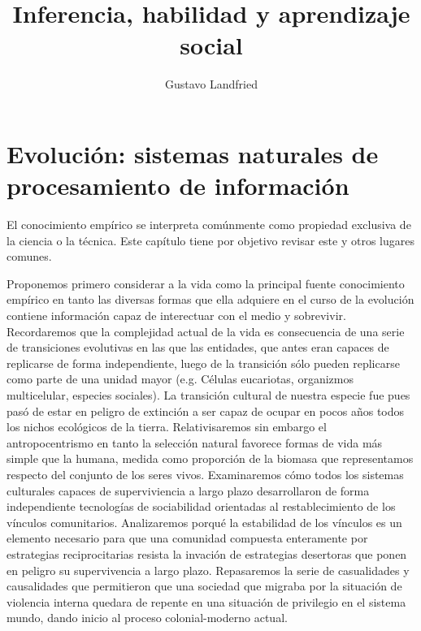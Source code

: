 \documentclass[a4paper,10pt]{book}
\title{\huge Inferencia, habilidad y aprendizaje social}
\author{Gustavo Landfried}
\theoremstyle{definition}
\begin{document}
\maketitle

\tableofcontents


\chapter{Evolución: sistemas naturales de procesamiento de información}




El conocimiento empírico se interpreta comúnmente como propiedad exclusiva de la ciencia o la técnica.
Este capítulo tiene por objetivo revisar este y otros lugares comunes.

Proponemos primero considerar a la vida como la principal fuente conocimiento empírico en tanto las diversas formas que ella adquiere en el curso de la evolución contiene información capaz de interectuar con el medio y sobrevivir.
Recordaremos que la complejidad actual de la vida es consecuencia de una serie de transiciones evolutivas en las que las entidades, que antes eran capaces de replicarse de forma independiente, luego de la transición sólo pueden replicarse como parte de una unidad mayor (e.g. Células eucariotas, organizmos multicelular, especies sociales).
La transición cultural de nuestra especie fue  pues pasó de estar en peligro de extinción a ser capaz de ocupar en pocos años todos los nichos ecológicos de la tierra.
Relativisaremos sin embargo el antropocentrismo en tanto la selección natural favorece formas de vida más simple que la humana, medida como proporción de la biomasa que representamos respecto del conjunto de los seres vivos.
Examinaremos cómo todos los sistemas culturales capaces de superviviencia a largo plazo desarrollaron de forma independiente tecnologías de sociabilidad orientadas al restablecimiento de los vínculos comunitarios.
Analizaremos porqué la estabilidad de los vínculos es un elemento necesario para que una comunidad compuesta enteramente por estrategias reciprocitarias resista la invación de estrategias desertoras que ponen en peligro su supervivencia a largo plazo.
Repasaremos la serie de casualidades y causalidades que permitieron que una sociedad que migraba por la situación de violencia interna quedara de repente en una situación de privilegio en el sistema mundo, dando inicio al proceso colonial-moderno actual.
\end{document}
